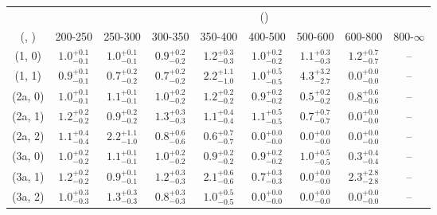 \begin{table}[h!]
\tiny
\centering
{}
\begin{tabular}
{ccccccccc}
	\hline\hline
&	& \multicolumn{8}{c}{\scalht (\gev)} \\ 
	 (\njet,  \nb) & 200-250 & 250-300 & 300-350 & 350-400 & 400-500 & 500-600 & 600-800 & 800-$\infty$ \\ [0.8ex] 
\hline
	(1, 0) & $1.0^{+ 0.1 }_{- 0.1 }$ & $1.0^{+ 0.1 }_{- 0.1 }$ & $0.9^{+ 0.2 }_{- 0.2 }$ & $1.2^{+ 0.3 }_{- 0.3 }$ & $1.0^{+ 0.2 }_{- 0.2 }$ & $1.1^{+ 0.3 }_{- 0.3 }$ & $1.2^{+ 0.7 }_{- 0.7 }$ & -- \\[0.5ex] 
	(1, 1) & $0.9^{+ 0.1 }_{- 0.1 }$ & $0.7^{+ 0.2 }_{- 0.2 }$ & $0.7^{+ 0.2 }_{- 0.2 }$ & $2.2^{+ 1.1 }_{- 1.0 }$ & $1.0^{+ 0.5 }_{- 0.5 }$ & $4.3^{+ 3.2 }_{- 2.7 }$ & $0.0^{+ 0.0 }_{- 0.0 }$ & -- \\[0.5ex] 
	(2a, 0) & $1.0^{+ 0.1 }_{- 0.1 }$ & $1.1^{+ 0.1 }_{- 0.1 }$ & $1.0^{+ 0.2 }_{- 0.2 }$ & $1.2^{+ 0.2 }_{- 0.2 }$ & $0.9^{+ 0.2 }_{- 0.2 }$ & $0.5^{+ 0.2 }_{- 0.2 }$ & $0.8^{+ 0.6 }_{- 0.6 }$ & -- \\[0.5ex] 
	(2a, 1) & $1.2^{+ 0.2 }_{- 0.2 }$ & $0.9^{+ 0.2 }_{- 0.2 }$ & $1.3^{+ 0.3 }_{- 0.3 }$ & $1.1^{+ 0.4 }_{- 0.4 }$ & $1.1^{+ 0.5 }_{- 0.5 }$ & $0.7^{+ 0.7 }_{- 0.7 }$ & $0.0^{+ 0.0 }_{- 0.0 }$ & -- \\[0.5ex] 
	(2a, 2) & $1.1^{+ 0.4 }_{- 0.4 }$ & $2.2^{+ 1.1 }_{- 1.0 }$ & $0.8^{+ 0.6 }_{- 0.6 }$ & $0.6^{+ 0.7 }_{- 0.7 }$ & $0.0^{+ 0.0 }_{- 0.0 }$ & $0.0^{+ 0.0 }_{- 0.0 }$ & $0.0^{+ 0.0 }_{- 0.0 }$ & -- \\[0.5ex] 
	(3a, 0) & $1.0^{+ 0.2 }_{- 0.2 }$ & $1.1^{+ 0.1 }_{- 0.1 }$ & $1.0^{+ 0.2 }_{- 0.2 }$ & $0.9^{+ 0.2 }_{- 0.2 }$ & $0.9^{+ 0.2 }_{- 0.2 }$ & $1.0^{+ 0.5 }_{- 0.5 }$ & $0.3^{+ 0.4 }_{- 0.4 }$ & -- \\[0.5ex] 
	(3a, 1) & $1.2^{+ 0.2 }_{- 0.2 }$ & $0.9^{+ 0.1 }_{- 0.1 }$ & $1.2^{+ 0.3 }_{- 0.3 }$ & $2.1^{+ 0.6 }_{- 0.6 }$ & $0.7^{+ 0.3 }_{- 0.3 }$ & $0.0^{+ 0.0 }_{- 0.0 }$ & $2.3^{+ 2.8 }_{- 2.8 }$ & -- \\[0.5ex] 
	(3a, 2) & $1.0^{+ 0.3 }_{- 0.3 }$ & $1.3^{+ 0.3 }_{- 0.3 }$ & $0.8^{+ 0.3 }_{- 0.3 }$ & $1.0^{+ 0.5 }_{- 0.5 }$ & $0.0^{+ 0.0 }_{- 0.0 }$ & $0.0^{+ 0.0 }_{- 0.0 }$ & $0.0^{+ 0.0 }_{- 0.0 }$ & -- \\[0.5ex] 

\end{tabular}
\end{table}
